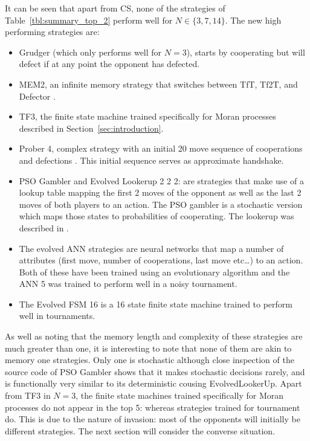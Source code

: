 \documentclass{article}
\begin{document}
It can be seen that apart from CS, none of the strategies
of Table~\ref{tbl:summary_top_2} perform well for \(N\in\{3, 7, 14\}\). The new
high performing strategies are:

\begin{itemize}
    \item Grudger (which only performs well for \(N=3\)), starts by cooperating
        but will defect if at any point the opponent has defected.
    \item MEM2, an infinite memory strategy that switches between TfT, Tf2T, and
        Defector \cite{Li2014}.
    \item TF3, the finite state machine trained specifically for Moran processes
        described in Section~\ref{sec:introduction}.
    \item Prober 4, complex strategy with an initial 20 move sequence of
        cooperations and defections \cite{prison}. This initial sequence serves
        as approximate handshake.
    \item  PSO Gambler and Evolved Lookerup 2 2 2: are strategies that make use
        of a lookup table mapping the first 2 moves of the opponent as well as
        the last 2 moves of both players to an action. The PSO gambler is a
        stochastic version which maps those states to probabilities of
        cooperating. The lookerup was described in \cite{Knight2016}.
	\item The evolved ANN strategies are neural networks that map a number of
		attributes (first move, number of cooperations, last move etc\dots) to
		an action. Both of these have been trained using an evolutionary
		algorithm and the ANN 5 was trained to perform well in a noisy
		tournament.
    \item The Evolved FSM 16 is a 16 state finite state machine trained to
        perform well in tournaments.
\end{itemize}

As well as noting that the memory length and complexity of these strategies are
much greater than one, it is interesting to note that none of them are akin to
memory one strategies. Only one is stochastic although close inspection of the
source code of PSO Gambler shows that it makes stochastic decisions rarely, and
is functionally very similar to its deterministic cousing EvolvedLookerUp. Apart
from TF3 in \(N=3\), the finite state machines trained specifically for Moran
processes do not appear in the top 5: whereas strategies trained for tournament do.
This is due to the nature of invasion: most of the opponents will initially be different
strategies. The next section will consider the converse situation.
\end{document}
